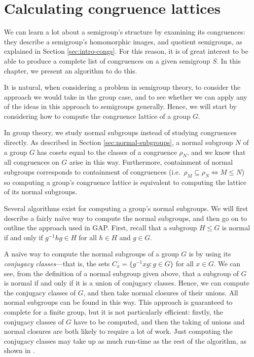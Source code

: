 \chapter{Calculating congruence lattices}
\label{chap:lattice}

We can learn a lot about a semigroup's structure by examining its congruences:
they describe a semigroup's homomorphic images, and quotient semigroups, as
explained in Section \ref{sec:intro-congs}.  For this reason, it is of great
interest to be able to produce a complete list of congruences on a given
semigroup $S$.  In this chapter, we present an algorithm to do this.

It is natural, when considering a problem in semigroup theory, to consider the
approach we would take in the group case, and to see whether we can apply any of
the ideas in this approach to semigroups generally.  Hence, we will start by
considering how to compute the congruence lattice of a group $G$.

In group theory, we study normal subgroups instead of studying congruences
directly.  As described in Section \ref{sec:normal-subgroups}, a normal subgroup
$N$ of a group $G$ has cosets equal to the classes of a congruence $\rho_N$, and
we know that all congruences on $G$ arise in this way.  Furthermore, containment
of normal subgroups corresponds to containment of congruences
(i.e.~$\rho_M \subseteq \rho_N \iff M \leq N$) so computing a group's congruence
lattice is equivalent to computing the lattice of its normal subgroups.

Several algorithms exist for computing a group's normal subgroups.  We will
first describe a fairly na\"ive way to compute the normal subgroups, and then go
on to outline the approach used in GAP.  First, recall that a subgroup
$H \leq G$ is normal if and only if $g^{-1}hg \in H$ for all $h \in H$ and
$g \in G$.

 A na\"ive way to compute the normal subgroups of a group
$G$ is by using its \textit{conjugacy classes}---that is, the sets
$C_x = \{g^{-1}xg : g \in G\}$ for all $x \in G$.  We can see, from the
definition of a normal subgroup given above, that a subgroup of $G$ is normal if
and only if it is a union of conjugacy classes.  Hence, we can compute the
conjugacy classes of $G$, and then take normal closures of their unions.  All
normal subgroups can be found in this way.  This approach is guaranteed to
complete for a finite group, but it is not particularly efficient: firstly, the
conjugacy classes of $G$ have to be computed, and then the taking of unions and
normal closures are both likely to require a lot of work.  Just computing the
conjugacy classes may take up as much run-time as the rest of the algorithm, as
shown in \cite[Table 1]{hulpke_1998}.

